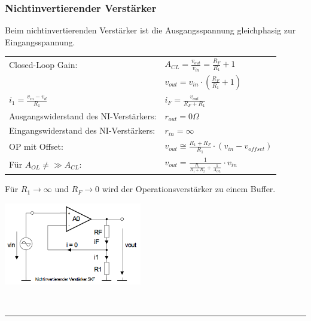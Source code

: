 	\subsubsection{Nichtinvertierender Verstärker}
			Beim nichtinvertierenden Verstärker ist die Ausgangsspannung
      gleichphasig zur Eingangsspannung.\\ 
	 \begin{minipage}[T]{12cm}
      	
        \begin{tabular}{ll}
        	Closed-Loop Gain: &
        	$A_{CL}=\frac{v_{out}}{v_{in}}=\frac{R_F}{R_1}+1$\\
        	& $v_{out} = v_{in}\cdot(\frac{R_F}{R_1}+1)$ \\
        	$i_1=\frac{v_{in}-v_d}{R_1}$ &
        	$i_F=\frac{v_{out}}{R_F+R_1}$\\
          Ausgangswiderstand des NI-Verstärkers: &
          $r_{out}=0\Omega$\\
          Eingangswiderstand des NI-Verstärkers: &
          $r_{in}=\infty$\\
          OP mit Offset: &
          $v_{out} \cong \frac{R_1+R_F}{R_1} \cdot (v_{in}-v_{offset})$\\
          Für $A_{OL} \neq \gg A_{CL}$: & $v_{out} = 
          \frac{1}{\frac{R_1}{R_1+R_2}+\frac{1}{A_{OL}}}\cdot v_{in}$ \\
        \end{tabular}
        
        Für $R_1 \to \infty$ und $R_F \to 0$ wird der Operationsverstärker zu einem
        Buffer.          	
      \end{minipage}
      \begin{minipage}{6cm}
      	\includegraphics[width=6cm]{./images/ni-verstaerker.png}
      \end{minipage}\\
\hrule

